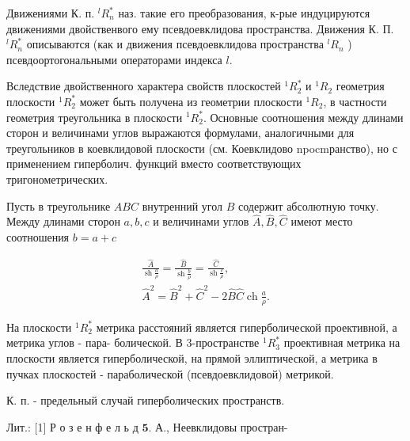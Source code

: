 \documentclass[10pt]{article}
\begin{document}
Движениями К. п. ${ }^{l} R_{n}^{*}$ наз. такие его преобразования, к-рые индуцируются движениями двойственвого ему псевдоевклидова пространства. Движения К. П. ${ }^{l} R_{n}^{*}$ описываются (как и движения псевдоевклидова пространства ${ }^{l} R_{n}$ ) псевдоортогональными операторами индекса $l$.



Вследствие двойственного характера свойств плоскостей ${ }^{1} R_{2}^{*}$ и ${ }^{1} R_{2}$ геометрия плоскости ${ }^{1} R_{2}^{*}$ может быть получена из геометрии плоскости ${ }^{1} R_{2}$, в частности геометрия треугольника в плоскости ${ }^{1} R_{2}^{*}$. Основные соотношения между длинами сторон и величинами углов выражаются формулами, аналогичными для треугольников в коевклидовой плоскости (см. Коевклидово npocmранство), но с применением гиперболич. функций вместо соответствующих тригонометрических.



Пусть в треугольнике $A B C$ внутренний угол $B$ содержит абсолютную точку. Между длинами сторон $a, b, c$ и величинами углов $\hat{A}, \hat{B}, \widehat{C}$ имеют место соотношения $b=a+c$



\[

\begin{gathered}

\frac{\hat{A}}{\operatorname{sh} \frac{a}{\rho}}=\frac{\widehat{B}}{\operatorname{sh} \frac{b}{\rho}}=\frac{\widehat{C}}{\operatorname{sh} \frac{c}{\rho}}, \\

\widehat{A}^{2}=\widehat{B}^{2}+\widehat{C}^{2}-2 \widehat{B} \widehat{C} \operatorname{ch} \frac{a}{\rho} .

\end{gathered}

\]



На плоскости ${ }^{1} R_{2}^{*}$ метрика расстояний является гиперболической проективной, а метрика углов - пара- болической. В 3-пространстве ${ }^{1} R_{3}^{*}$ проективная метрика на плоскости является гиперболической, на прямой эллиптической, а метрика в пучках плоскостей - параболической (псевдоевклидовой) метрикой.



К. п. - предельный случай гиперболических пространств.



Лит.: [1] Р о з е н ф е л ь д $\mathbf{5}$. А., Неевклидовы простран-
\end{document}
